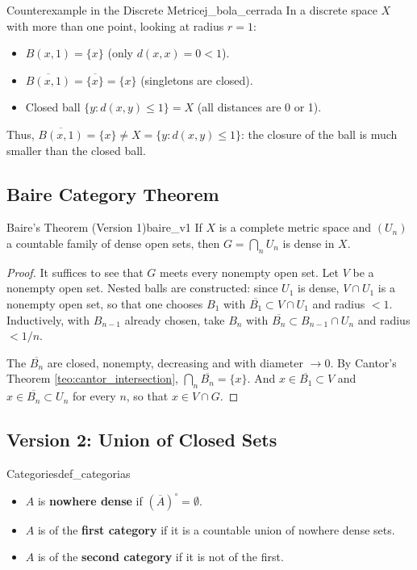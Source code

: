 \documentclass[11pt, a4paper]{article}
\begin{document}
\begin{ejemplo}{Counterexample in the Discrete Metric}{ej_bola_cerrada}
In a discrete space $X$ with more than one point, looking at radius $r = 1$:
\begin{itemize}
    \item $B(x, 1) = \{x\}$ (only $d(x,x) = 0 < 1$).
    \item $\overline{B(x, 1)} = \overline{\{x\}} = \{x\}$ (singletons are closed).
    \item Closed ball $\{y : d(x,y) \le 1\} = X$ (all distances are 0 or 1).
\end{itemize}
Thus, $\overline{B(x, 1)} = \{x\} \ne X = \{y : d(x,y) \le 1\}$: the closure of the ball is much
smaller than the closed ball.
\end{ejemplo}

\subsection{Baire Category Theorem}

\begin{teorema}{Baire's Theorem (Version 1)}{baire_v1}
If $X$ is a complete metric space and $(U_n)$ a countable family of dense open sets, then
$G = \bigcap_n U_n$ is dense in $X$.
\end{teorema}

\begin{proof}
It suffices to see that $G$ meets every nonempty open set. Let $V$ be a nonempty open set. Nested balls
are constructed: since $U_1$ is dense, $V \cap U_1$ is a nonempty open set, so that one chooses $B_1$ with
$\overline{B_1} \subset V \cap U_1$ and radius $< 1$. Inductively, with $B_{n-1}$ already chosen, take
$B_n$ with $\overline{B_n} \subset B_{n-1} \cap U_n$ and radius $< 1/n$.

The $\overline{B_n}$ are closed, nonempty, decreasing and with diameter $\to 0$. By Cantor's
Theorem \ref{teo:cantor_intersection}, $\bigcap_n \overline{B_n} = \{x\}$. And $x \in \overline{B_1} \subset V$ and
$x \in \overline{B_n} \subset U_n$ for every $n$, so that $x \in V \cap G$.
\end{proof}

\subsection{Version 2: Union of Closed Sets}

\begin{definicion}{Categories}{def_categorias}
    \begin{itemize}
        \item $A$ is \textbf{nowhere dense} if $(\overline{A})^\circ = \emptyset$.
        \item $A$ is of the \textbf{first category} if it is a countable union of nowhere dense sets.
        \item $A$ is of the \textbf{second category} if it is not of the first.
    \end{itemize}
\end{definicion}
\end{document}
